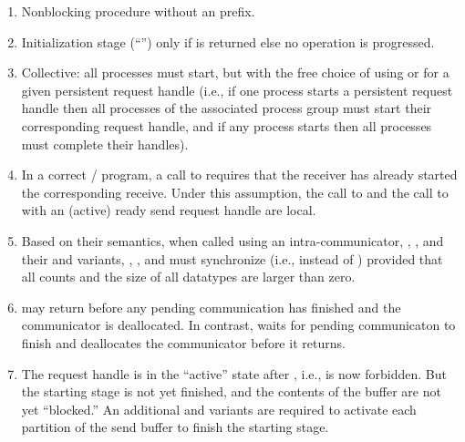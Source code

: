 {\begin{enumerate}
      initializes the receive buffer
      (i.e., two \MPI/ procedures together implement the initialization stage).
\item \label{semantics:item14} Nonblocking procedure without an  prefix.
\item \label{semantics:item15} Initialization stage (``'') only if  is returned else no operation is progressed.
\item \label{semantics:item16} Collective: all processes must start, but with the free choice of using 
     or  for a given persistent request handle
     (i.e., if one process starts a persistent request handle then all processes
     of the associated process group must start their corresponding request handle,
     and if any process starts then all processes must complete their handles).
\item \label{semantics:item17} In a correct \MPI/ program, a call to  requires
that the receiver has already started the corresponding receive.
Under this assumption, the call to  and the call to
 with an (active) ready send request handle are local.
\item \label{semantics:item18} Based on their semantics, when called using an intra-communicator, ,
     , and their  and 
     variants, , , and  
     must synchronize (i.e.,  instead of  ) provided that all counts
     and the size of all datatypes are larger than zero.
\item \label{semantics:item19}  may return
  before any pending communication has finished and the communicator
  is deallocated. In contrast,  waits
  for pending communicaton to finish and deallocates the
  communicator before it returns. 
\item \label{semantics:item20} The request handle is in the ``active'' state after , i.e.,  is now forbidden.
But the starting stage is not yet finished, and the contents of the buffer are not yet ``blocked.''
An additional  and variants 
are required to activate each partition of the send buffer to finish the starting stage.

\end{enumerate}}
